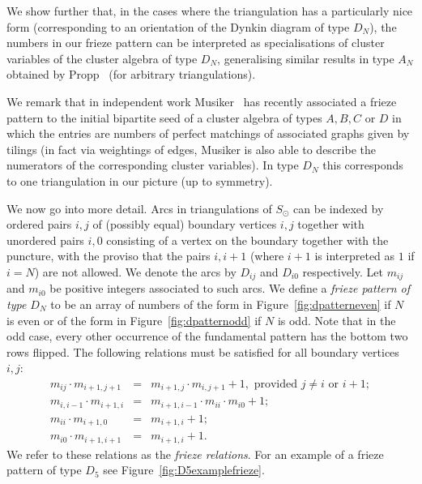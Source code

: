 \documentclass[a4paper]{amsart}
\begin{document}
We show further that, in the cases where the triangulation has a particularly
nice form (corresponding to an orientation of the Dynkin diagram of
type $D_N$), the numbers in our frieze pattern can be interpreted as
specialisations of cluster variables of the cluster algebra of type $D_N$,
generalising similar results in type $A_N$ obtained by Propp~\cite{propp}
(for arbitrary triangulations).

We remark that in independent work Musiker~\cite{musiker} has recently
associated a frieze pattern to the initial bipartite seed of a
cluster algebra of types $A,B,C$ or $D$ in which the entries are
numbers of perfect matchings of associated graphs given by tilings
(in fact via weightings of edges, Musiker is also able to describe the
numerators of the corresponding cluster variables).
In type $D_N$ this corresponds to one triangulation in our picture
(up to symmetry).

We now go into more detail.
Arcs in triangulations of $S_{\odot}$ can be indexed by ordered pairs $i,j$ of
(possibly equal) boundary vertices $i,j$ together with
unordered pairs $i,0$ consisting of a vertex on the boundary together with
the puncture, with the proviso that the pairs $i,i+1$ (where $i+1$ is
interpreted as $1$ if $i=N$) are not allowed. We denote the arcs by
$D_{ij}$ and $D_{i0}$ respectively. Let $m_{ij}$ and $m_{i0}$ be
positive integers associated to such arcs.
We define a \emph{frieze pattern of type $D_N$} to
be an array of numbers of the form in Figure~\ref{fig:dpatterneven} if
$N$ is even or of the form in Figure~\ref{fig:dpatternodd} if $N$ is odd.
Note that in the odd case, every other occurrence of the fundamental pattern
has the bottom two rows flipped.
The following relations must be satisfied for all boundary vertices
$i,j$:
\begin{eqnarray}
m_{ij}\cdot m_{i+1,j+1} & = & m_{i+1,j}\cdot m_{i,j+1} + 1, 
\mbox{ provided $j\neq i$ or $i+1$}; \label{eqn:relation1} \\
m_{i,i-1}\cdot m_{i+1,i} & = & m_{i+1,i-1}\cdot m_{ii}\cdot m_{i0}+1;
\label{eqn:relation2} \\
m_{ii}\cdot m_{i+1,0} & = & m_{i+1,i} + 1; \label{eqn:relation3} \\
m_{i0}\cdot m_{i+1,i+1} & = & m_{i+1,i} + 1. \label{eqn:relation4}
\end{eqnarray}
We refer to these relations as the \emph{frieze relations}. For an example
of a frieze pattern of type $D_5$ see Figure~\ref{fig:D5examplefrieze}.
\end{document}
